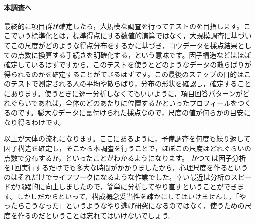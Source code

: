 \documentclass{ltjsbook}
\begin{document}
\paragraph{本調査へ}最終的に項目群が確定したら，大規模な調査を行ってテストのを目指します。ここでいう標準化とは，標準得点にする数値的演算ではなく，大規模調査に基づいてこの尺度がどのような得点分布をするかに基づき，ロウデータを採点結果としての点数に換算する手続きを明確化する，という意味です。因子構造などはほぼ確定しているはずですから，このテストを使うとどのようなデータの散らばりが得られるのかを確定することができるはずです。この最後のステップの目的はこのテストで測定される人の平均や散らばり，分布の形状を確認し，確定することにあります。使うときに逐一分析しなくてもいいように，項目回答パターンがどれぐらいであれば，全体のどのあたりに位置するかといったプロフィールをつくるのです。膨大なデータに裏付けられた採点なので，尺度の値が何らかの目安になり得るわけです。

以上が大体の流れになります。ここにあるように，予備調査を何度も繰り返して因子構造を確定し，そこから本調査を行うことで，ほぼこの尺度はどれぐらいの点数で分布するか，といったことがわかるようになります。
かつては因子分析を1回実行するだけでも多大な時間がかかりましたから，心理尺度を作るというのはそれだけでライフワークになるような作業でした。幸い最近は分析のスピードが飛躍的に向上しましたので，簡単に分析してやり直すということができます。しかしだからといって，構成概念妥当性を疎かにしてはいけませんし，「やったらこうなった」というようなやり逃げ研究になるのではなく，使うための尺度を作るのだということは忘れてはいけないでしょう。
\end{document}
